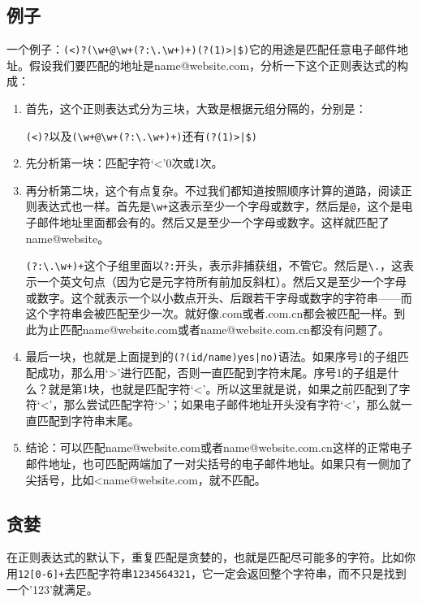 \documentclass[a4paper,12pt]{report}
\newenvironment{feae}{\begin{enumerate}[font=\bfseries,labelindent=0pt]}
    {\end{enumerate}}
\begin{document}
\subsection{例子}
一个例子：\verb-(<)?(\w+@\w+(?:\.\w+)+)(?(1)>|$)-它的用途是匹配任意电子邮件地址。假设我们要匹配的地址是name@website.com，分析一下这个正则表达式的构成：
\begin{feae}
\item 首先，这个正则表达式分为三块，大致是根据元组分隔的，分别是：

\begin{center}
\verb|(<)?|以及\verb|(\w+@\w+(?:\.\w+)+)|还有\verb+(?(1)>|$)+
\end{center}

\item 先分析第一块：匹配字符`<'0次或1次。
\item 再分析第二块，这个有点复杂。不过我们都知道按照顺序计算的道路，阅读正则表达式也一样。首先是\verb|\w+|这表示至少一个字母或数字，然后是\verb|@|，这个是电子邮件地址里面都会有的。然后又是至少一个字母或数字。这样就匹配了name@website。

\verb|(?:\.\w+)+|这个子组里面以\verb|?:|开头，表示非捕获组，不管它。然后是\verb|\.|，这表示一个英文句点（因为它是元字符所有前加反斜杠）。然后又是至少一个字母或数字。这个就表示一个以小数点开头、后跟若干字母或数字的字符串——而这个字符串会被匹配至少一次。就好像.com或者.com.cn都会被匹配一样。到此为止匹配name@website.com或者name@website.com.cn都没有问题了。

\item 最后一块，也就是上面提到的\verb+(?(id/name)yes|no)+语法。如果序号1的子组匹配成功，那么用`>'进行匹配，否则一直匹配到字符末尾。序号1的子组是什么？就是第1块，也就是匹配字符`<'。所以这里就是说，如果之前匹配到了字符`<'，那么尝试匹配字符`>'；如果电子邮件地址开头没有字符`<'，那么就一直匹配到字符串末尾。

\item 结论：可以匹配name@website.com或者name@website.com.cn这样的正常电子邮件地址，也可匹配两端加了一对尖括号的电子邮件地址。如果只有一侧加了尖括号，比如<name@website.com，就不匹配。
\end{feae}

\subsection{贪婪}
在正则表达式的默认下，重复匹配是贪婪的，也就是匹配尽可能多的字符。比如你用\verb|12[0-6]+|去匹配字符串\verb|1234564321|，它一定会返回整个字符串，而不只是找到一个'123'就满足。
\end{document}
